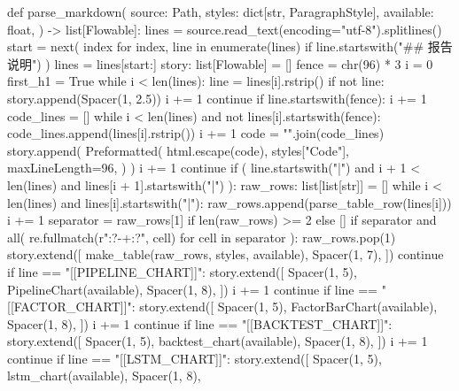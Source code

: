 \documentclass[UTF8,a4paper,fontset=fandol]{ctexart}
\begin{document}
\begin{ProjectCode}
def parse_markdown(
    source: Path,
    styles: dict[str, ParagraphStyle],
    available: float,
) -> list[Flowable]:
    lines = source.read_text(encoding="utf-8").splitlines()
    start = next(
        index
        for index, line in enumerate(lines)
        if line.startswith("## 报告说明")
    )
    lines = lines[start:]
    story: list[Flowable] = []
    fence = chr(96) * 3
    i = 0
    first_h1 = True
    while i < len(lines):
        line = lines[i].rstrip()
        if not line:
            story.append(Spacer(1, 2.5))
            i += 1
            continue
        if line.startswith(fence):
            i += 1
            code_lines = []
            while i < len(lines) and not lines[i].startswith(fence):
                code_lines.append(lines[i].rstrip())
                i += 1
            code = "\n".join(code_lines)
            story.append(
                Preformatted(
                    html.escape(code),
                    styles["Code"],
                    maxLineLength=96,
                )
            )
            i += 1
            continue
        if (
            line.startswith("|")
            and i + 1 < len(lines)
            and lines[i + 1].startswith("|")
        ):
            raw_rows: list[list[str]] = []
            while i < len(lines) and lines[i].startswith("|"):
                raw_rows.append(parse_table_row(lines[i]))
                i += 1
            separator = raw_rows[1] if len(raw_rows) >= 2 else []
            if separator and all(
                re.fullmatch(r":?-+:?", cell) for cell in separator
            ):
                raw_rows.pop(1)
            story.extend([
                make_table(raw_rows, styles, available),
                Spacer(1, 7),
            ])
            continue
        if line == "[[PIPELINE_CHART]]":
            story.extend([
                Spacer(1, 5),
                PipelineChart(available),
                Spacer(1, 8),
            ])
            i += 1
            continue
        if line == "[[FACTOR_CHART]]":
            story.extend([
                Spacer(1, 5),
                FactorBarChart(available),
                Spacer(1, 8),
            ])
            i += 1
            continue
        if line == "[[BACKTEST_CHART]]":
            story.extend([
                Spacer(1, 5),
                backtest_chart(available),
                Spacer(1, 8),
            ])
            i += 1
            continue
        if line == "[[LSTM_CHART]]":
            story.extend([
                Spacer(1, 5),
                lstm_chart(available),
                Spacer(1, 8),

\end{ProjectCode}
\end{document}
